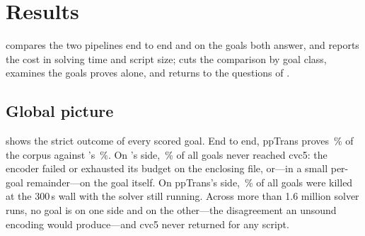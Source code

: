 \section{Results}
\label{sec:beer-results}

 compares the two pipelines end to end and on the goals both answer, and reports the cost in solving time and script size;  cuts the comparison by goal class,  examines the goals \beer{} proves alone, and  returns to the questions of .

\subsection{Global picture}
\label{sec:beer-results-global}

 shows the strict outcome of every scored goal.
End to end, ppTrans proves \bmPptAll\,\% of the corpus against \beer{}'s \bmBeerAll\,\%.
On \beer{}'s side, \bmNoScript\,\% of all goals never reached cvc5: the encoder failed or exhausted its budget on the enclosing file, or---in a small per-goal remainder---on the goal itself.
On ppTrans's side, \bmPptKilled\,\% of all goals were killed at the \(300\)\,s wall with the solver still running.
Across more than 1.6 million solver runs, no goal is  on one side and  on the other---the disagreement an unsound encoding would produce---and cvc5 never returned  for any script.

